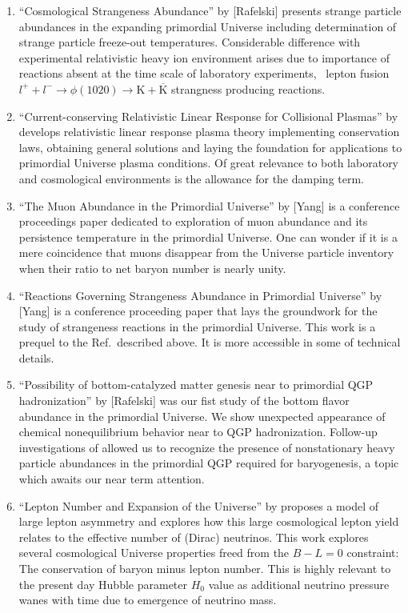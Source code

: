 \begin{enumerate}
%
\item ``Cosmological Strangeness Abundance'' by [Rafelski] presents strange particle abundances in the expanding primordial Universe including determination of strange particle freeze-out temperatures. {\color{blue} Considerable difference with experimental relativistic heavy ion environment arises due to importance of reactions absent at the time scale of laboratory experiments, \eg\ lepton fusion $l^+ +l^-\to\phi(1020)\to \mathrm{K}+\overline{\mathrm K}$ strangness producing reactions.}
\item ``Current-conserving Relativistic Linear Response for Collisional Plasmas'' by  develops relativistic linear response plasma theory implementing conservation laws, obtaining general solutions and laying the foundation for applications to primordial Universe plasma conditions. {\color{blue} Of great relevance to both laboratory and cosmological environments is the allowance for the damping term.}
%
\item ``The Muon Abundance in the Primordial Universe'' by [Yang] is a conference proceedings paper dedicated to exploration of muon abundance and its persistence temperature in the primordial Universe. {\color{blue} One can wonder if it is a mere coincidence that muons disappear from the Universe particle inventory when their ratio to net baryon number is nearly unity.}
%
\item ``Reactions Governing Strangeness Abundance in Primordial Universe'' by [Yang] is a conference proceeding paper that lays the groundwork for the study of strangeness reactions in the primordial Universe. {\color{blue} This work is a prequel to the Ref.\,\cite{Yang:2021bko} described above. It is more accessible in some of technical details.}
%
\item ``Possibility of bottom-catalyzed matter genesis near to primordial QGP hadronization'' by [Rafelski] was our fist study of the bottom flavor abundance in the primordial Universe. {\color{blue} We show unexpected appearance of chemical nonequilibrium behavior near to QGP hadronization. Follow-up investigations of allowed us to recognize the presence of nonstationary heavy particle abundances in the primordial QGP required for baryogenesis, a topic which awaits our near term attention.}
%
\item ``Lepton Number and Expansion of the Universe'' by  proposes a model of large lepton asymmetry and explores how this large cosmological lepton yield relates to the effective number of (Dirac) neutrinos. {\color{blue} This work explores several cosmological Universe properties freed from the $B-L=0$ constraint: The conservation of baryon minus lepton number. This is highly relevant to the present day Hubble parameter $H_0$ value as additional neutrino pressure wanes with time due to emergence of neutrino mass.}

\end{enumerate}
